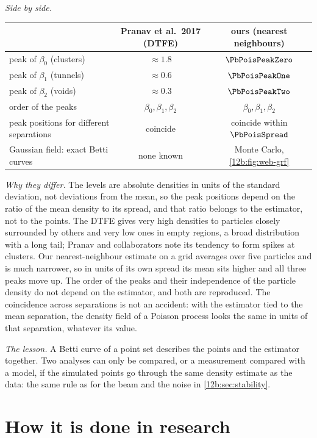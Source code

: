 \emph{Side by side.}
\begin{center}
\small
\begin{tabular}{lcc}
\toprule
 & Pranav et al.\ 2017 (DTFE) & ours (nearest neighbours)\\
\midrule
peak of $\beta_0$ (clusters) & $\approx1.8$ & $\PbPoisPeakZero$\\
peak of $\beta_1$ (tunnels) & $\approx0.6$ & $\PbPoisPeakOne$\\
peak of $\beta_2$ (voids) & $\approx0.3$ & $\PbPoisPeakTwo$\\
order of the peaks & $\beta_0,\beta_1,\beta_2$ & $\beta_0,\beta_1,\beta_2$\\
peak positions for different separations & coincide & coincide within $\PbPoisSpread$\\
Gaussian field: exact Betti curves & none known & Monte Carlo, \cref{12b:fig:web-grf}\\
\bottomrule
\end{tabular}
\end{center}

\emph{Why they differ.} The levels are absolute densities in units of the standard deviation, not deviations from the
mean, so the peak positions depend on the ratio of the mean density to its spread, and that ratio belongs to the
estimator, not to the points. The DTFE gives very high densities to particles closely surrounded by others and very
low ones in empty regions, a broad distribution with a long tail; Pranav and collaborators note its tendency to form
spikes at clusters. Our nearest-neighbour estimate on a grid averages over five particles and is much narrower, so in
units of its own spread its mean sits higher and all three peaks move up. The order of the peaks and their independence
of the particle density do not depend on the estimator, and both are reproduced. The coincidence across separations is
not an accident: with the estimator tied to the mean separation, the density field of a Poisson process looks the same in
units of that separation, whatever its value.

\emph{The lesson.} A Betti curve of a point set describes the points and the estimator together. Two analyses can only
be compared, or a measurement compared with a model, if the simulated points go through the same density estimate as
the data: the same rule as for the beam and the noise in \cref{12b:sec:stability}.
\section{How it is done in research}
\label{12b:sec:research}

